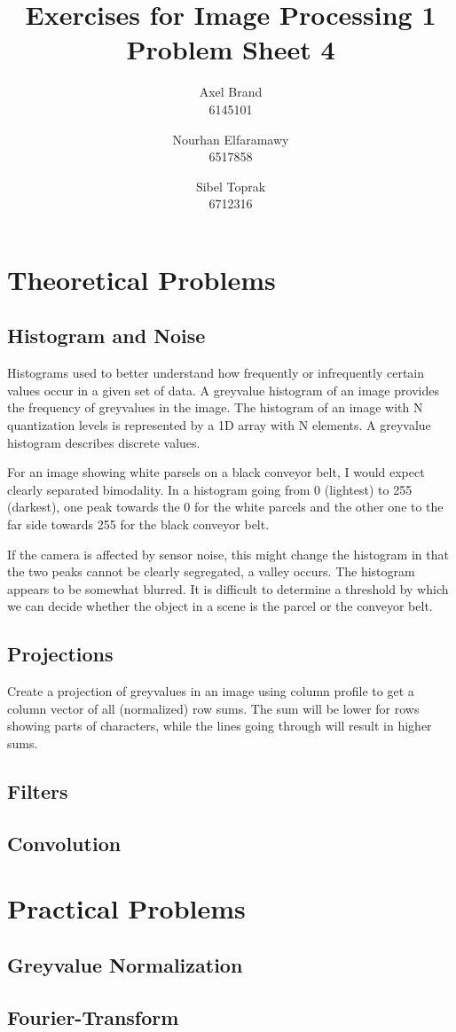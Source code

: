 \documentclass[a4paper,twocolumn]{article}
\title{\textbf{Exercises for Image Processing 1}\\Problem Sheet 4}
\author{Axel Brand\\6145101 \and Nourhan Elfaramawy\\6517858 \and Sibel Toprak\\6712316}
\begin{document}
	\maketitle
	
	\section{Theoretical Problems}
	
	\subsection{Histogram and Noise}
	Histograms used to better understand how frequently or infrequently certain values occur in a given set of data. A greyvalue histogram of an image provides the frequency of greyvalues in the image. The histogram of an image with N quantization levels is represented by a 1D array with N elements. A greyvalue histogram describes discrete values.
	
	For an image showing white parsels on a black conveyor belt, I would expect clearly separated bimodality. In a histogram going from 0 (lightest) to 255 (darkest), one peak towards the 0 for the white parcels and the other one to the far side towards 255 for the black conveyor belt.
	
	If the camera is affected by sensor noise, this might change the histogram in that the two peaks cannot be clearly segregated, a valley occurs. The histogram appears to be somewhat blurred. It is difficult to determine a threshold by which we can decide whether the object in a scene is the parcel or the conveyor belt.
	
	\subsection{Projections}
	
	Create a projection of greyvalues in an image using column profile to get a column vector of all (normalized) row sums. The sum will be lower for rows showing parts of characters, while the lines going through will result in higher sums. 
	
	\subsection{Filters}
	
	\subsection{Convolution}
	
	\section{Practical Problems}
	
	\subsection{Greyvalue Normalization}
	
	\subsection{Fourier-Transform}
	
\end{document}
